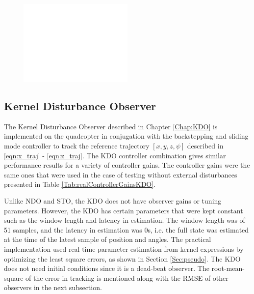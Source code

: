\documentclass[letterpaper%
, twoside%
, 12pt%
,memoire%
, english%
,creativecommons,hyperref%
]{thETS}
\theoremstyle{newThmStyle}
\begin{document}
\begin{figure}[H]
	\includegraphics[width=0.5\textwidth]{Figures/blank.png}
\end{figure}
\FloatBarrier
\subsection{Kernel Disturbance Observer}
The Kernel Disturbance Observer described in Chapter \ref{Chap:KDO} is implemented on the quadcopter in conjugation with the backstepping and sliding mode controller to track the reference trajectory $[x,y,z,\psi]$ described in \eqref{eqn:x_traj} - \eqref{eqn:z_traj}. The KDO controller combination gives similar performance results for a variety of controller gains. The controller gains were the same ones that were used in the case of testing without external disturbances presented in Table  \ref{Tab:realControllerGainsKDO}.

Unlike NDO and STO, the KDO does not have observer gains or tuning parameters. However, the KDO has certain parameters that were kept constant such as the window length and latency in estimation. The window length was of 51 samples, and the latency in estimation was 0s, i.e. the full state was estimated at the time of the latest sample of position and angles. The practical implementation used real-time parameter estimation from kernel expressions by optimizing the least square errors, as shown in Section \ref{Sec:pseudo}. The KDO does not need initial conditions since it is a dead-beat observer. The root-mean-square of the error in tracking is mentioned along with the RMSE of other observers in the next subsection.
\end{document}
